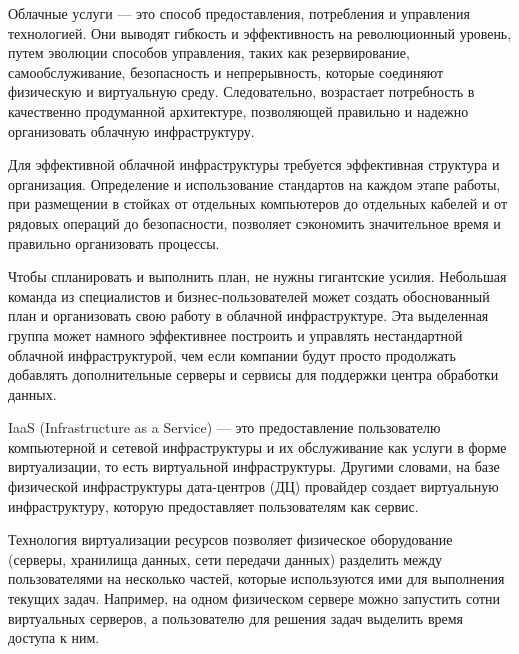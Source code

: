 
Облачные услуги --- это способ предоставления, потребления и управления технологией.
Они выводят гибкость и эффективность на революционный уровень, путем эволюции способов управления, таких как резервирование, самообслуживание, безопасность и непрерывность, которые соединяют физическую и виртуальную среду.
Следовательно, возрастает потребность в качественно продуманной архитектуре, позволяющей правильно и надежно организовать облачную инфраструктуру.

Для эффективной облачной инфраструктуры требуется эффективная структура и организация.
Определение и использование стандартов на каждом этапе работы, при размещении в стойках от отдельных компьютеров до отдельных кабелей и от рядовых операций до безопасности, позволяет сэкономить значительное время и правильно организовать процессы.

Чтобы спланировать и выполнить план, не нужны гигантские усилия.
Небольшая команда из специалистов и бизнес-пользователей может создать обоснованный план и организовать свою работу в облачной инфраструктуре.
Эта выделенная группа может намного эффективнее построить и управлять нестандартной облачной инфраструктурой, чем если компании будут просто продолжать добавлять дополнительные серверы и сервисы для поддержки центра обработки данных.

IaaS (Infrastructure as a Service) --- это предоставление пользователю компьютерной и сетевой инфраструктуры и их обслуживание как услуги в форме виртуализации, то есть виртуальной инфраструктуры.
Другими словами, на базе физической инфраструктуры дата-центров (ДЦ) провайдер создает виртуальную инфраструктуру, которую предоставляет пользователям как сервис.

Технология виртуализации ресурсов позволяет физическое оборудование (серверы, хранилища данных, сети передачи данных) разделить между пользователями на несколько частей, которые используются ими для выполнения текущих задач.
Например, на одном физическом сервере можно запустить сотни виртуальных серверов, а пользователю для решения задач выделить время доступа к ним.

\clearpage
